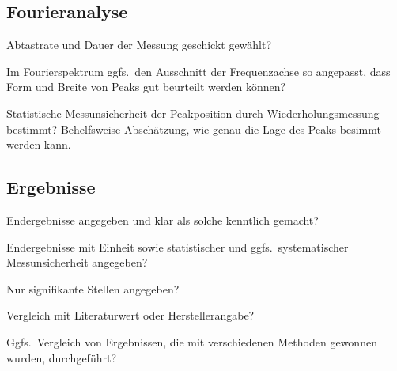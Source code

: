 \documentclass[twoside]{protokoll}
\begin{document}
\subsection*{Fourieranalyse}
\begin{checklist}
\item Abtastrate und Dauer der Messung geschickt gewählt?
\item Im Fourierspektrum ggfs.~den Ausschnitt der Frequenzachse so
  angepasst, dass Form und Breite von Peaks gut beurteilt werden
  können?
\item Statistische Messunsicherheit der Peakposition durch
  Wiederholungsmessung bestimmt? Behelfsweise Abschätzung, wie genau
  die Lage des Peaks besimmt werden kann.
\end{checklist}

\subsection*{Ergebnisse}
\begin{checklist}
\item Endergebnisse angegeben und klar als solche kenntlich gemacht?
\item Endergebnisse mit Einheit sowie statistischer und
  ggfs.~systematischer Messunsicherheit angegeben?
\item Nur signifikante Stellen angegeben?
\item Vergleich mit Literaturwert oder Herstellerangabe?
\item Ggfs.~Vergleich von Ergebnissen, die mit verschiedenen Methoden
  gewonnen wurden, durchgeführt?
\end{checklist}
\end{document}
